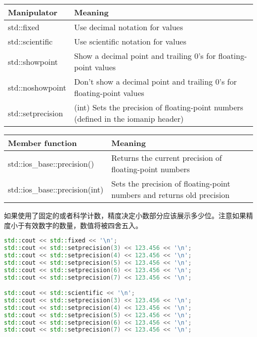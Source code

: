 \documentclass[../../LearnCpp.tex]{subfiles}
\begin{document}
\begin{center}
  \begin{tiny}
    \begin{tabularx}{ 1\textwidth}{
        | >{\raggedright\arraybackslash}X
        | >{\raggedright\arraybackslash}X |
      }
      \hline
      Manipulator       & Meaning                                                                            \\
      \hline
      std::fixed        & Use decimal notation for values                                                    \\
      std::scientific   & Use scientific notation for values                                                 \\
      std::showpoint    & Show a decimal point and trailing 0’s for floating-point values                    \\
      std::noshowpoint  & Don’t show a decimal point and trailing 0’s for floating-point values              \\
      std::setprecision & (int)	Sets the precision of floating-point numbers (defined in the iomanip header) \\
      \hline
    \end{tabularx}
  \end{tiny}
\end{center}

\begin{center}
  \begin{tiny}
    \begin{tabularx}{ 1\textwidth}{
        | >{\raggedright\arraybackslash}X
        | >{\raggedright\arraybackslash}X |
      }
      \hline
      Member function                & Meaning                                                                \\
      \hline
      std::ios\_base::precision()    & Returns the current precision of floating-point numbers                \\
      std::ios\_base::precision(int) & Sets the precision of floating-point numbers and returns old precision \\
      \hline
    \end{tabularx}
  \end{tiny}
\end{center}

如果使用了固定的或者科学计数，精度决定小数部分应该展示多少位。注意如果精度小于有效数字的数量，数值将被四舍五入。

\begin{lstlisting}[language=C++]
std::cout << std::fixed << '\n';
std::cout << std::setprecision(3) << 123.456 << '\n';
std::cout << std::setprecision(4) << 123.456 << '\n';
std::cout << std::setprecision(5) << 123.456 << '\n';
std::cout << std::setprecision(6) << 123.456 << '\n';
std::cout << std::setprecision(7) << 123.456 << '\n';

std::cout << std::scientific << '\n';
std::cout << std::setprecision(3) << 123.456 << '\n';
std::cout << std::setprecision(4) << 123.456 << '\n';
std::cout << std::setprecision(5) << 123.456 << '\n';
std::cout << std::setprecision(6) << 123.456 << '\n';
std::cout << std::setprecision(7) << 123.456 << '\n';
\end{lstlisting}
\end{document}
